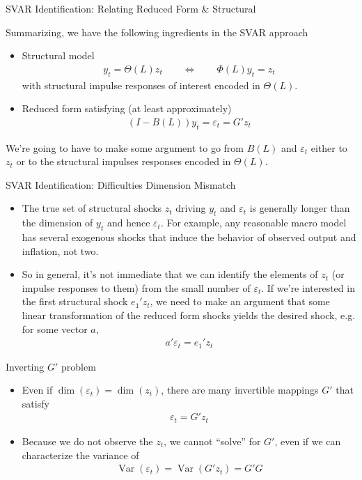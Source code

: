 \documentclass[aspectratio=169, handout]{beamer}
\newcommand{\Var}{\operatorname{Var}}
\begin{document}
{\scriptsize
\begin{frame}{SVAR Identification: Relating Reduced Form \& Structural}

Summarizing, we have the following ingredients in the SVAR approach
\begin{itemize}
  \item \alert{Structural model}
    \begin{align*}
      y_t = \Theta(L)z_t
      \qquad\iff\qquad
      \Phi(L)y_t = z_t
    \end{align*}
    with \alert{structural impulse responses} of interest encoded in
    $\Theta(L)$.

  \item Reduced form satisfying (at least approximately)
    \begin{align*}
      (I-B(L))y_t = \varepsilon_t = G'z_t
    \end{align*}
\end{itemize}
We're going to have to make some argument to go from $B(L)$ and
$\varepsilon_t$ either to $z_t$ or to the structural impulses responses
encoded in $\Theta(L)$.
\end{frame}
}


{\scriptsize
\begin{frame}{SVAR Identification: Difficulties}
Dimension Mismatch
\begin{itemize}
  \item The true set of structural shocks $z_t$ driving $y_t$ and
    $\varepsilon_t$ is generally \alert{longer} than the dimension of
    $y_t$ and hence $\varepsilon_t$.
    For example, any reasonable macro model has \alert{several}
    exogenous shocks that induce the behavior of observed output and
    inflation, not two.

  \item
    So in general, it's not immediate that we can identify the elements
    of $z_t$ (or impulse responses to them) from the small number of
    $\varepsilon_t$.
    If we're interested in the first structural shock $e_1'z_t$, we need
    to make an argument that some linear transformation of the reduced
    form shocks yields the desired shock, e.g. for some vector $a$,
    \begin{align*}
      a'\varepsilon_t = e_1'z_t
    \end{align*}
\end{itemize}
Inverting $G'$ problem
\begin{itemize}
  \item Even if $\dim(\varepsilon_t)=\dim(z_t)$,
    there are \alert{many} invertible mappings $G'$ that satisfy
    \begin{align*}
      \varepsilon_t = G'z_t
    \end{align*}

  \item Because we do not observe the $z_t$, we cannot ``solve'' for
    $G'$, even if we can characterize the variance of
    \begin{align*}
      \Var(\varepsilon_t) = \Var(G'z_t) = G'G
    \end{align*}
\end{itemize}
\end{frame}
}
\end{document}
